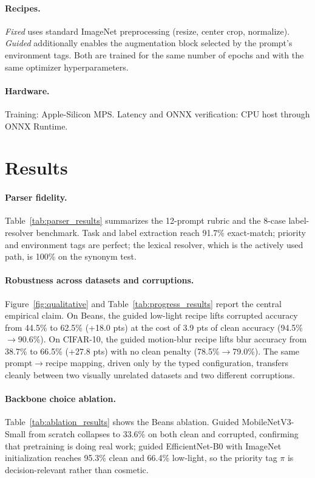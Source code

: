 \documentclass[10pt,twocolumn,letterpaper]{article}
\begin{document}
\paragraph{Recipes.} \textit{Fixed} uses standard ImageNet
preprocessing (resize, center crop, normalize). \textit{Guided}
additionally enables the augmentation block selected by the prompt's
environment tags. Both are trained for the same number of epochs and
with the same optimizer hyperparameters.
\paragraph{Hardware.} Training: Apple-Silicon MPS. Latency and ONNX
verification: CPU host through ONNX Runtime.

\section{Results}
\paragraph{Parser fidelity.} Table~\ref{tab:parser_results}
summarizes the 12-prompt rubric and the 8-case label-resolver
benchmark. Task and label extraction reach 91.7\% exact-match;
priority and environment tags are perfect; the lexical resolver,
which is the actively used path, is 100\% on the synonym test.
\paragraph{Robustness across datasets and corruptions.}
Figure~\ref{fig:qualitative} and Table~\ref{tab:progress_results}
report the central empirical claim. On Beans, the guided low-light
recipe lifts corrupted accuracy from 44.5\% to 62.5\% (+18.0 pts) at
the cost of 3.9 pts of clean accuracy (94.5\%$\to$90.6\%). On
CIFAR-10, the guided motion-blur recipe lifts blur accuracy from
38.7\% to 66.5\% (+27.8 pts) with no clean penalty
(78.5\%$\to$79.0\%). The same prompt$\to$recipe mapping, driven only
by the typed configuration, transfers cleanly between two
visually unrelated datasets and two different corruptions.
\paragraph{Backbone choice ablation.} Table~\ref{tab:ablation_results}
shows the Beans ablation. Guided MobileNetV3-Small from scratch
collapses to 33.6\% on both clean and corrupted, confirming that
pretraining is doing real work; guided EfficientNet-B0 with ImageNet
initialization reaches 95.3\% clean and 66.4\% low-light, so the
priority tag $\pi$ is decision-relevant rather than cosmetic.
\end{document}
